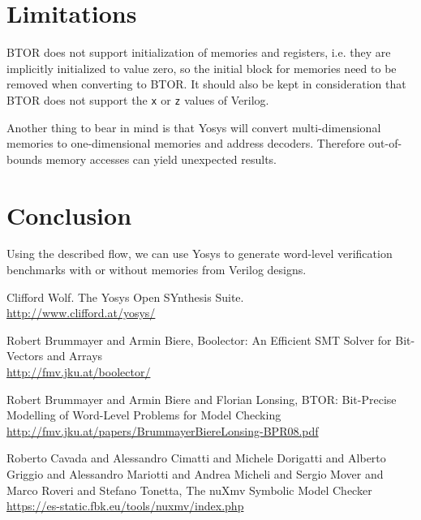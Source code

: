 \documentclass[9pt,technote,a4paper]{IEEEtran}
\begin{document}
\section{Limitations}

BTOR does not support initialization of memories and registers, i.e. they are
implicitly initialized to value zero, so the initial block for
memories need to be removed when converting to BTOR. It should
also be kept in consideration that BTOR does not support the {\tt x} or {\tt z}
values of Verilog.

Another thing to bear in mind is that Yosys will convert multi-dimensional
memories to one-dimensional memories and address decoders. Therefore
out-of-bounds memory accesses can yield unexpected results.

\section{Conclusion}

Using the described flow, we can use Yosys to generate word-level
verification benchmarks with or without memories from Verilog designs.

\begin{thebibliography}{9}

Clifford Wolf. The Yosys Open SYnthesis Suite. \\
\url{http://www.clifford.at/yosys/}

Robert Brummayer and Armin Biere, Boolector: An Efficient SMT Solver for Bit-Vectors and Arrays\\
\url{http://fmv.jku.at/boolector/}

Robert Brummayer and Armin Biere and Florian Lonsing, BTOR:
Bit-Precise Modelling of Word-Level Problems for Model Checking\\
\url{http://fmv.jku.at/papers/BrummayerBiereLonsing-BPR08.pdf}

Roberto Cavada and Alessandro Cimatti and Michele Dorigatti and
Alberto Griggio and Alessandro Mariotti and Andrea Micheli and Sergio
Mover and Marco Roveri and Stefano Tonetta, The nuXmv Symbolic Model
Checker\\
\url{https://es-static.fbk.eu/tools/nuxmv/index.php}

\end{thebibliography}
\end{document}
